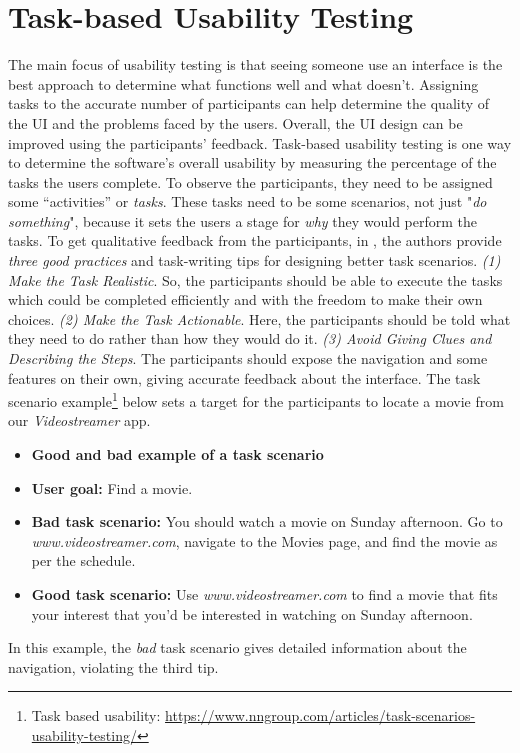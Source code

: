 \section{Task-based Usability Testing}
\label{background:section:task}
The main focus of usability testing is that seeing someone use an interface is the best approach to determine what functions well and what doesn't. 
Assigning tasks to the accurate number of participants can help determine the quality of the UI and the problems faced by the users. 
Overall, the UI design can be improved using the participants' feedback. 
Task-based usability testing is one way to determine the software's overall usability \cite{article:usability:doesburg} by measuring the percentage of the tasks the users complete.
To observe the participants, they need to be assigned some ``activities'' or \textit{tasks}. 
These tasks need to be some scenarios, not just "\textit{do something}", because it sets the users a stage for \textit{why} they would perform the tasks. 
To get qualitative feedback from the participants, in \cite{misc:usability:tasks}, the authors provide \textit{three good practices} and task-writing tips for designing better task scenarios.
\textit{(1) Make the Task Realistic}.
So, the participants should be able to execute the tasks which could be completed efficiently and with the freedom to make their own choices.
\textit{(2) Make the Task Actionable}.
Here, the participants should be told what they need to do rather than how they would do it.
\textit{(3) Avoid Giving Clues and Describing the Steps}.
The participants should expose the navigation and some features on their own, giving accurate feedback about the interface.
The task scenario example\footnote{Task based usability: \url{https://www.nngroup.com/articles/task-scenarios-usability-testing/}} below sets a target for the participants to locate a movie from our \textit{Videostreamer} app.
\begin{itemize}
  \item[] \textbf{Good and bad example of a task scenario}
  \item \textbf{User goal:} Find a movie. 
  \item \textbf{Bad task scenario:} You should watch a movie on Sunday afternoon. Go to\\ \textit{www.videostreamer.com}, navigate to the Movies page, and find the movie as per the schedule.
  \item \textbf{Good task scenario:} Use \textit{www.videostreamer.com} to find a movie that fits your interest that you'd be interested in watching on Sunday afternoon. 
\end{itemize}
In this example, the \textit{bad} task scenario gives detailed information about the navigation, violating the third tip.

